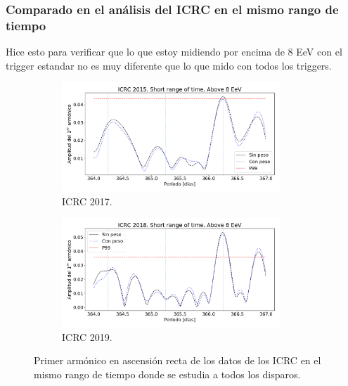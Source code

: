 			\subsubsection{Comparado en el análisis del ICRC en el mismo rango de tiempo}
				Hice esto para verificar que  lo que estoy midiendo por encima de 8 EeV con el trigger estandar no es muy diferente que lo que mido con todos los triggers.

				\begin{figure}[H]
					\begin{subfigure}[b]{0.5\textwidth}
					\centering
						\includegraphics[width=0.9\textwidth]{../Anisotropia/ICRC/ICRC_2017_Short_time_Above_8_EeV.png}
						\caption{ICRC 2017.} 	\label{fig:8EeV_short_range_ICRC2017}
					\end{subfigure}%
					\begin{subfigure}[b]{0.5\textwidth}
					\centering
						\includegraphics[width=0.9\textwidth]{../Anisotropia/ICRC/ICRC_2019_Short_time_Above_8_EeV.png}
						\caption{ICRC 2019.} 	\label{fig:8EeV_short_range_ICRC2019}
					\end{subfigure}
					\caption{Primer armónico en ascensión recta de los datos de los ICRC en el mismo rango de tiempo donde se estudia a todos los disparos.}
				\end{figure}


